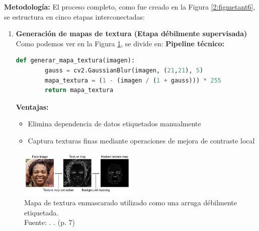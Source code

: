 \textbf{Metodología:}
El proceso completo, como fue creado en la Figura \ref{2:figmetant6}, se estructura en cinco etapas interconectadas:

\begin{enumerate}
    \item \textbf{Generación de mapas de textura (Etapa débilmente supervisada)}
    Como podemos ver en la Figura \ref{2:figtextmap}, se divide en:
	\textbf{Pipeline técnico:}
    \begin{lstlisting}[language=Python, basicstyle=\ttfamily\footnotesize]
    def generar_mapa_textura(imagen):
        gauss = cv2.GaussianBlur(imagen, (21,21), 5)
        mapa_textura = (1 - (imagen / (1 + gauss))) * 255
        return mapa_textura
    \end{lstlisting}
    \textbf{Ventajas:}
    \begin{itemize}[label=$\bullet$, leftmargin=1em]
        \item Elimina dependencia de datos etiquetados manualmente
        \item Captura texturas finas mediante operaciones de mejora de contraste local
    \end{itemize}
\end{enumerate}

	\begin{figure}[H]
		\begin{center}
			\includegraphics[width=0.5\textwidth]{2/figures/texturemap.png}
			\caption[Mapa de textura enmascarado utilizado como una arruga débilmente etiquetada]{Mapa de textura enmascarado utilizado como una arruga débilmente etiquetada.\\
				Fuente: \cite{moon2024dermatology}. . (p. 7)}
			\label{2:figtextmap}
		\end{center}
	\end{figure}	


